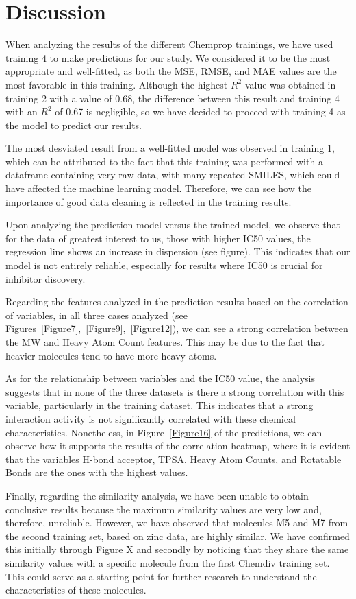 \documentclass[final,times,twocolumn,article]{elsarticle}
\begin{document}
\section{Discussion}

When analyzing the results of the different Chemprop trainings, we have used training 4 to make predictions for our study. We considered it to be the most appropriate and well-fitted, as both the MSE, RMSE, and MAE values are the most favorable in this training. Although the highest $R^2$ value was obtained in training 2 with a value of 0.68, the difference between this result and training 4 with an $R^2$ of 0.67 is negligible, so we have decided to proceed with training 4 as the model to predict our results.

The most desviated result from a well-fitted model was observed in training 1, which can be attributed to the fact that this training was performed with a dataframe containing very raw data, with many repeated SMILES, which could have affected the machine learning model. Therefore, we can see how the importance of good data cleaning is reflected in the training results.

Upon analyzing the prediction model versus the trained model, we observe that for the data of greatest interest to us, those with higher IC50 values, the regression line shows an increase in dispersion (see figure). This indicates that our model is not entirely reliable, especially for results where IC50 is crucial for inhibitor discovery.

Regarding the features analyzed in the prediction results based on the correlation of variables, in all three cases analyzed (see Figures~\ref{Figure7},~\ref{Figure9},~\ref{Figure12}), we can see a strong correlation between the MW and Heavy Atom Count features. This may be due to the fact that heavier molecules tend to have more heavy atoms.

As for the relationship between variables and the IC50 value, the analysis suggests that in none of the three datasets is there a strong correlation with this variable, particularly in the training dataset. This indicates that a strong interaction activity is not significantly correlated with these chemical characteristics. Nonetheless, in Figure~\ref{Figure16} of the predictions, we can observe how it supports the results of the correlation heatmap, where it is evident that the variables H-bond acceptor, TPSA, Heavy Atom Counts, and Rotatable Bonds are the ones with the highest values.

Finally, regarding the similarity analysis, we have been unable to obtain conclusive results because the maximum similarity values are very low and, therefore, unreliable. However, we have observed that molecules M5 and M7 from the second training set, based on zinc data, are highly similar. We have confirmed this initially through Figure X and secondly by noticing that they share the same similarity values with a specific molecule from the first Chemdiv training set. This could serve as a starting point for further research to understand the characteristics of these molecules.
\end{document}
